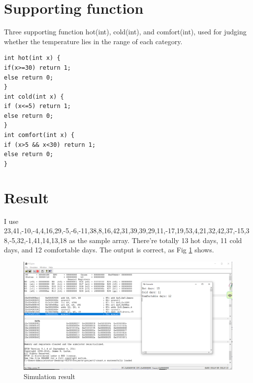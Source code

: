 \documentclass[a4paper,12pt]{article}
\begin{document}
\section{Supporting function}
\par Three supporting function hot(int), cold(int), and comfort(int), used for judging whether the temperature lies in the range of each category.
\begin{lstlisting}
int hot(int x) {
if(x>=30) return 1;
else return 0;
}
int cold(int x) {
if (x<=5) return 1;
else return 0;
}
int comfort(int x) {
if (x>5 && x<30) return 1;
else return 0;
}
\end{lstlisting}
 
 

\section{Result}
\par I use {23,41,-10,-4,4,16,29,-5,-6,-11,38,8,16,42,31,39,39,29,11,-17,19,53,4,21,32,42,37,-15,38,-5,32,-1,41,14,13,18}
as the sample array. There're totally 13 hot days, 11 cold days, and 12 comfortable days. The output is correct, as Fig \ref{result} shows.
\begin{figure}[H]
\centering
\includegraphics[scale=0.4]{result.png}
\caption{Simulation result}
\label{result}
\end{figure}
\end{document}
